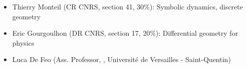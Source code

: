 \begin{itemize}

\item Thierry Monteil (CR CNRS, section 41, 30\%): %
  Symbolic dynamics, discrete
  geometry%


\item Eric Gourgoulhon (DR CNRS, section 17, 20\%): %
  Differential geometry for physics%
\item Luca De Feo (Ass. Professor, \CS, Université de Versailles - Saint-Quentin)
\end{itemize}




